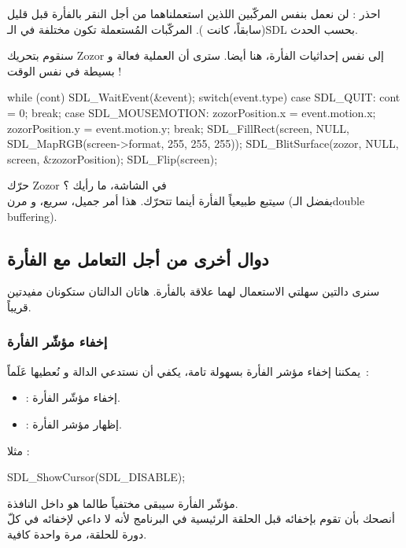 \begin{warning}
احذر : لن نعمل بنفس المركّبين اللذين استعملناهما من أجل النقر بالفأرة قبل قليل (سابقاً، كانت
).
المركّبات المُستعملة تكون مختلفة في الـ\textenglish{SDL}
بحسب الحدث.
\end{warning}

سنقوم بتحريك
\textenglish{Zozor}
إلى نفس إحداثيات الفأرة، هنا أيضا. سترى أن العملية فعالة و بسيطة في نفس الوقت !

\begin{Csource}
while (cont)
{
	SDL_WaitEvent(&event);
	switch(event.type)
	{
		case SDL_QUIT:
		cont = 0;
		break;
		case SDL_MOUSEMOTION:
		zozorPosition.x = event.motion.x;
		zozorPosition.y = event.motion.y;
		break;
	}
	SDL_FillRect(screen, NULL, SDL_MapRGB(screen->format, 255, 255, 255));
	SDL_BlitSurface(zozor, NULL, screen, &zozorPosition); 
	SDL_Flip(screen);
}
\end{Csource}

حرّك
\textenglish{Zozor}
في الشاشة، ما رأيك ؟\\
سيتبع طبيعياً الفأرة أينما تتحرّك. هذا أمر جميل، سريع، و مرن (بفضل الـ\textenglish{double buffering}).

\subsection{دوال أخرى من أجل التعامل مع الفأرة}

سنرى دالتين سهلتي الاستعمال لهما علاقة بالفأرة. هاتان الدالتان ستكونان مفيدتين قريباً.

\subsubsection{إخفاء مؤشّر الفأرة}

يمكننا إخفاء مؤشر الفأرة بسهولة تامة، يكفي أن نستدعي الدالة
و نُعطيها عَلَماً~:

\begin{itemize}
	\item {} :
	إخفاء مؤشّر الفأرة.
	\item {} :
	إظهار مؤشر الفأرة.
\end{itemize}
مثلا :

\begin{Csource}
SDL_ShowCursor(SDL_DISABLE);
\end{Csource}

مؤشّر الفأرة سيبقى مختفياً طالما هو داخل النافذة.\\
أنصحك بأن تقوم بإخفائه قبل الحلقة الرئيسية في البرنامج لأنه لا داعي لإخفائه في كلّ دورة للحلقة، مرة واحدة كافية.


